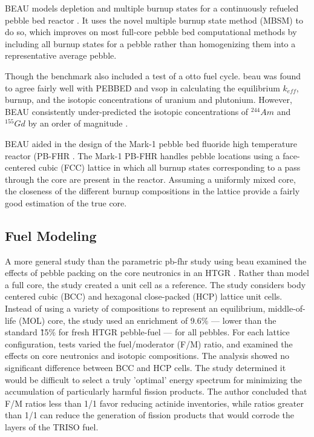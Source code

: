 BEAU models depletion and multiple burnup states for a continuously refueled pebble bed reactor \cite{cisneros_pebble_2013}. It uses the novel multiple burnup state method (MBSM) to do so, which improves on most full-core pebble bed computational methods by including all burnup states for a pebble rather than homogenizing them into a representative average pebble.


Though the benchmark also included a test of a \acrfull{otto} fuel cycle.  \acrshort{beau} was found to agree fairly well with PEBBED and \acrshort{vsop} in calculating the equilibrium $k_{eff}$, burnup, and the isotopic concentrations of uranium and plutonium.  However, BEAU consistently under-predicted the isotopic concentrations of $^{244}Am$ and $^{155}Gd$ by an order of magnitude \cite{cisneros_pebble_2013}.

BEAU aided in the design of the Mark-1 pebble bed fluoride high temperature reactor (PB-FHR \cite{cisneros_pebble_2013}.  The Mark-1 PB-FHR handles pebble locations using a face-centered cubic (FCC) lattice in which all burnup states corresponding to a pass through the core are  present in the reactor.  Assuming a uniformly mixed core, the closeness of the different burnup compositions in the lattice provide a fairly good estimation of the true core.


\subsection{Fuel Modeling}

A more general study than the parametric \acrshort{pb-fhr} study using \acrshort{beau} examined the effects of pebble packing on the core neutronics in an HTGR \cite{turkmen_effect_2012}.  Rather than model a full core, the study created a unit cell as a reference.  The study considers body centered cubic (BCC) and hexagonal close-packed (HCP) lattice unit cells.  Instead of using a variety of compositions to represent an equilibrium, middle-of-life (MOL) core, the study used an enrichment of 9.6\%  --- lower than the standard \~15\% for fresh HTGR pebble-fuel --- for all pebbles.  For each lattice configuration, tests varied the fuel/moderator (F/M) ratio, and examined the effects on core neutronics and isotopic compositions.  The analysis showed no significant difference between BCC and HCP cells.  The study determined it would be difficult to select a truly 'optimal' energy spectrum for minimizing the accumulation of particularly harmful fission products.  The author concluded that F/M ratios less than 1/1 favor reducing actinide inventories, while ratios greater than 1/1 can reduce the generation of fission products that would corrode the layers of the TRISO fuel.

